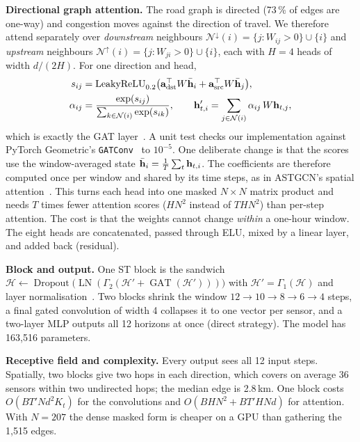 \textbf{Directional graph attention.} The road graph is directed (73\,\% of
edges are one-way) and congestion moves against the direction of travel. We
therefore attend separately over \emph{downstream} neighbours
$\mathcal{N}^{\downarrow}(i)=\{j: W_{ij}>0\}\cup\{i\}$ and \emph{upstream}
neighbours $\mathcal{N}^{\uparrow}(i)=\{j: W_{ji}>0\}\cup\{i\}$, each with $H{=}4$
heads of width $d/(2H)$. For one direction and head,
\begin{align}
s_{ij}&=\operatorname{LeakyReLU}_{0.2}\!\big(\mathbf{a}_{\mathrm{dst}}^\top W\bar{\mathbf{h}}_i+\mathbf{a}_{\mathrm{src}}^\top W\bar{\mathbf{h}}_j\big),\\
\alpha_{ij}&=\frac{\exp(s_{ij})}{\sum_{k\in\mathcal{N}(i)}\exp(s_{ik})},\qquad
\mathbf{h}'_{t,i}=\sum_{j\in\mathcal{N}(i)}\alpha_{ij}\,W\mathbf{h}_{t,j},
\label{eq:gat}
\end{align}
which is exactly the GAT layer~\cite{velickovic2018gat}. A unit test checks our
implementation against PyTorch Geometric's \texttt{GATConv}~\cite{fey2019pyg} to
$10^{-5}$. One deliberate change is that the scores use the window-averaged state
$\bar{\mathbf{h}}_i=\frac{1}{T}\sum_t\mathbf{h}_{t,i}$. The coefficients are therefore
computed once per window and shared by its time steps, as in ASTGCN's spatial
attention~\cite{guo2019astgcn}. This turns each head into one masked $N{\times}N$
matrix product and needs $T$ times fewer attention scores ($HN^2$ instead of
$THN^2$) than per-step attention. The cost is that the weights cannot change
\emph{within} a one-hour window. The eight heads are
concatenated, passed through ELU, mixed by a linear layer, and added back
(residual).

\textbf{Block and output.} One ST block is the sandwich
$\mathcal{H}\leftarrow\operatorname{Dropout}\big(\operatorname{LN}(\Gamma_2(\mathcal{H}'+\operatorname{GAT}(\mathcal{H}')))\big)$
with $\mathcal{H}'=\Gamma_1(\mathcal{H})$ and layer normalisation~\cite{ba2016layernorm}.
Two blocks shrink the window $12{\to}10{\to}8{\to}6{\to}4$ steps, a final gated
convolution of width 4 collapses it to one vector per sensor, and a two-layer MLP
outputs all 12 horizons at once (direct strategy). The model has 163,516 parameters.

\textbf{Receptive field and complexity.} Every output sees all 12 input steps.
Spatially, two blocks give two hops in each direction, which covers on average 36
sensors within two undirected hops; the median edge is 2.8\,km. One block costs
$O(BT'Nd^2K_t)$ for the convolutions and $O(BHN^2 + BT'HNd)$ for attention. With
$N{=}207$ the dense masked form is cheaper on a GPU than gathering the 1,515 edges.

